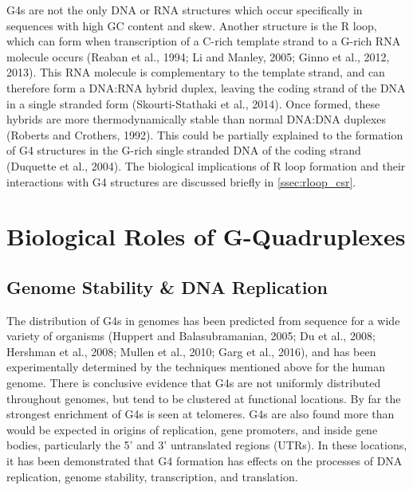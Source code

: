 \documentclass[12pt,a4paper,]{report}
\begin{document}
G4s are not the only DNA or RNA structures which occur specifically in
sequences with high GC content and skew. Another structure is the R
loop, which can form when transcription of a C-rich template strand to a
G-rich RNA molecule occurs (Reaban et al., 1994; Li and Manley, 2005;
Ginno et al., 2012, 2013). This RNA molecule is complementary to the
template strand, and can therefore form a DNA:RNA hybrid duplex, leaving
the coding strand of the DNA in a single stranded form (Skourti-Stathaki
et al., 2014). Once formed, these hybrids are more thermodynamically
stable than normal DNA:DNA duplexes (Roberts and Crothers, 1992). This
could be partially explained to the formation of G4 structures in the
G-rich single stranded DNA of the coding strand (Duquette et al., 2004).
The biological implications of R loop formation and their interactions
with G4 structures are discussed briefly in \autoref{ssec:rloop_csr}.

\newpage

\hypertarget{biological-roles-of-g-quadruplexes}{%
\section{Biological Roles of
G-Quadruplexes}\label{biological-roles-of-g-quadruplexes}}

\label{sec:biological_roles}

\hypertarget{genome-stability-dna-replication}{%
\subsection{Genome Stability \& DNA
Replication}\label{genome-stability-dna-replication}}

\label{ssec:genome_stability}

The distribution of G4s in genomes has been predicted from sequence for
a wide variety of organisms (Huppert and Balasubramanian, 2005; Du et
al., 2008; Hershman et al., 2008; Mullen et al., 2010; Garg et al.,
2016), and has been experimentally determined by the techniques
mentioned above for the human genome. There is conclusive evidence that
G4s are not uniformly distributed throughout genomes, but tend to be
clustered at functional locations. By far the strongest enrichment of
G4s is seen at telomeres. G4s are also found more than would be expected
in origins of replication, gene promoters, and inside gene bodies,
particularly the 5' and 3' untranslated regions (UTRs). In these
locations, it has been demonstrated that G4 formation has effects on the
processes of DNA replication, genome stability, transcription, and
translation.
\end{document}
